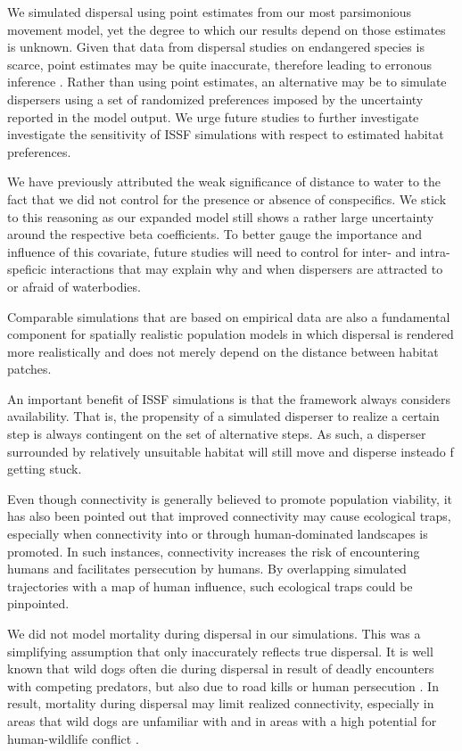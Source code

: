 \documentclass[abstract=on,10pt,a4paper,bibliography=totocnumbered]{article}
\begin{document}
We simulated dispersal using point estimates from our most parsimonious movement
model, yet the degree to which our results depend on those estimates is unknown.
Given that data from dispersal studies on endangered species is scarce, point
estimates may be quite inaccurate, therefore leading to erronous inference
\citep{Wiegand.2003, KramerSchadt.2007}. Rather than using point estimates, an
alternative may be to simulate dispersers using a set of randomized preferences
imposed by the uncertainty reported in the model output. We urge future studies
to further investigate investigate the sensitivity of ISSF simulations with
respect to estimated habitat preferences.

We have previously attributed the weak significance of distance to water to the
fact that we did not control for the presence or absence of conspecifics. We
stick to this reasoning as our expanded model still shows a rather large
uncertainty around the respective beta coefficients. To better gauge the
importance and influence of this covariate, future studies will need to control
for inter- and intra-speficic interactions that may explain why and when
dispersers are attracted to or afraid of waterbodies.

Comparable simulations that are based on empirical data are also a fundamental
component for spatially realistic population models in which dispersal is
rendered more realistically and does not merely depend on the distance between
habitat patches.

An important benefit of ISSF simulations is that the framework always considers
availability. That is, the propensity of a simulated disperser to realize a
certain step is always contingent on the set of alternative steps. As such, a
disperser surrounded by relatively unsuitable habitat will still move and
disperse insteado f getting stuck.

Even though connectivity is generally believed to promote population viability,
it has also been pointed out that improved connectivity may cause ecological
traps, especially when connectivity into or through human-dominated landscapes
is promoted. In such instances, connectivity increases the risk of encountering
humans and facilitates persecution by humans. By overlapping simulated
trajectories with a map of human influence, such ecological traps could be
pinpointed.

We did not model mortality during dispersal in our simulations. This was a
simplifying assumption that only inaccurately reflects true dispersal. It is
well known that wild dogs often die during dispersal in result of deadly
encounters with competing predators, but also due to road kills or human
persecution \citep{Woodroffe.2012, Behr.2021b}. In result, mortality during
dispersal may limit realized connectivity, especially in areas that wild dogs
are unfamiliar with and in areas with a high potential for human-wildlife
conflict \citep{Cozzi.2020}.
\end{document}
